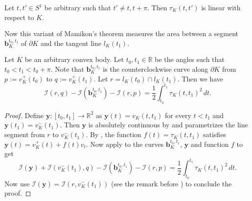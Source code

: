 \begin{corollary}

Let \(t, t' \in S^1\) be arbitrary such that \(t' \neq t, t + \pi\). Then \(\tau_K(t, t')\) is linear with respect to \(K\).

\label{cor:tangent-line-length-linear}
\end{corollary}

Now this variant of Mamikon’s theorem measures the area between a segment \(\mathbf{b}_K^{t_0, t_1}\) of \(\partial K\) and the tangent line \(l_K(t_1)\).

\begin{theorem}

Let \(K\) be an arbitrary convex body. Let \(t_0, t_1 \in \mathbb{R}\) be the angles such that \(t_0 < t_1 < t_0 + \pi\). Note that \(\mathbf{b}_K^{t_0, t_1}\) is the counterclockwise curve along \(\partial K\) from \(p := v_K^+(t_0)\) to \(q := v_K^+(t_1)\). Let \(r = l_K(t_0) \cap l_K(t_1)\). Then we have
\[
\mathcal{I}(r, q) - \mathcal{I}\left( \mathbf{b}_K^{t_0, t_1} \right) - \mathcal{I}\left(r, p \right) =  \frac{1}{2}\int_{t_0}^{t_1} \tau_{K}(t, t_1) ^2 \, dt.
\]

\label{thm:mamikon-tangent-line}
\end{theorem}

\begin{proof}
Define \(\mathbf{y} : [t_0, t_1] \to \mathbb{R}^2\) as \(\mathbf{y}(t) = v_K(t, t_1)\) for every \(t < t_1\) and \(\mathbf{y}(t_1) = v_K^-(t_1)\). Then \(\mathbf{y}\) is absolutely continuous by  and parametrizes the line segment from \(r\) to \(v_K^-(t_1)\). By , the function \(f(t) = \tau_K(t, t_1)\) satisfies \(\mathbf{y}(t) = v_K^+(t) + f(t) v_t\). Now apply  to the curves \(\mathbf{b}_{K}^{t_0, t_1}\), \(\mathbf{y}\) and function \(f\) to get
\[
\mathcal{I}(\mathbf{y}) + \mathcal{I}\left( v_K^-(t_1), q \right) - \mathcal{I}\left( \mathbf{b}_K^{t_0, t_1} \right)  - \mathcal{I}\left( r, p \right) = \frac{1}{2}\int_{t_0}^{t_1} \tau_{K}(t, t_1) ^2 \, dt.
\]
Now use \(\mathcal{I}(\mathbf{y}) = \mathcal{I}(r, v_K^-(t_1))\) (see the remark before ) to conclude the proof.
\end{proof}